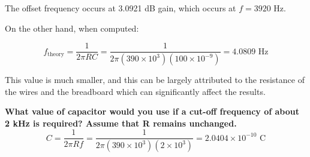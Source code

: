 \documentclass[a4paper,12pt,oneside, tikz]{book}
\begin{document}
The offset frequency occurs at 3.0921 dB gain, which occurs at $f = 3920$ Hz.

On the other hand, when computed:

$$f_\text{theory} = \frac{1}{2\pi RC} = \frac{1}{2\pi(390\times 10^3)(100 \times 10^{-9})} = 4.0809\text{ Hz}$$

This value is much smaller, and this can be largely attributed to the resistance of the wires and the breadboard which can significantly affect the results.

\begin{tcolorbox}
\textbf{What value of capacitor would you use if a cut-off frequency of about 2 kHz is required? Assume that R remains unchanged. }
$$C = \frac{1}{2\pi Rf} = \frac{1}{2\pi (390 \times 10^3)(2\times 10^3)} = 2.0404 \times 10^{-10}\text{ C}$$
\end{tcolorbox}
\end{document}
